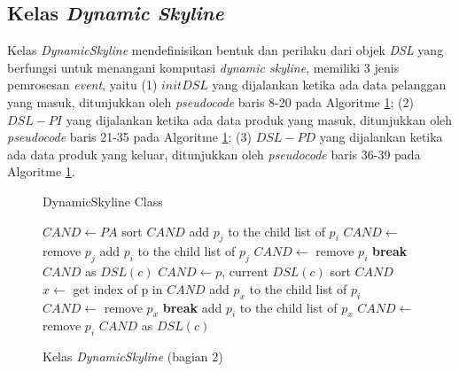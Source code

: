 \subsection{Kelas \textit{Dynamic Skyline}}
\tab Kelas \textit{DynamicSkyline} mendefinisikan bentuk dan perilaku dari objek \textit{DSL} yang berfungsi untuk menangani komputasi \textit{dynamic skyline}, memiliki 3 jenis pemrosesan \textit{event}, yaitu (1) $initDSL$ yang dijalankan ketika ada data pelanggan yang masuk, ditunjukkan oleh \textit{pseudocode} baris 8-20 pada Algoritme \ref{algo:dsl2}; (2) $DSL-PI$ yang dijalankan ketika ada data produk yang masuk, ditunjukkan oleh \textit{pseudocode} baris 21-35 pada Algoritme \ref{algo:dsl2}; (3) $DSL-PD$ yang dijalankan ketika ada data produk yang keluar, ditunjukkan oleh \textit{pseudocode} baris 36-39 pada Algoritme \ref{algo:dsl2}.

\begin{figure}[H]
	\begin{algorithm}[H]
		\caption{DynamicSkyline Class}
		\begin{algorithmic}[1]
			\State $CAND \leftarrow PA$
			\State sort $CAND$
			\State add $p_j$ to the child list of $p_i$
			\State $CAND \leftarrow$ remove $p_j$
			\State add $p_i$ to the child list of $p_j$
			\State $CAND \leftarrow$ remove $p_i$
			\State \textbf{break} 
			\EndIf
			\EndFor
			\State \Return $CAND$ as $DSL(c)$
			\EndFor
			\EndProcedure
			\State $CAND \leftarrow p$, current $DSL(c)$
			\State sort $CAND$
			\State $x \leftarrow$ get index of p in $CAND$
			\State add $p_x$ to the child list of $p_i$
			\State $CAND \leftarrow$ remove $p_x$
			\State \textbf{break}
			\EndIf
			\State add $p_i$ to the child list of $p_x$
			\State $CAND \leftarrow$ remove $p_i$
			\EndIf
			\EndIf
			\EndFor
			\State \Return $CAND$ as $DSL(c)$
			\EndProcedure
		\end{algorithmic}
	\end{algorithm}
	\caption{Kelas \textit{DynamicSkyline} (bagian 2) \label{algo:dsl2}}
\end{figure}

